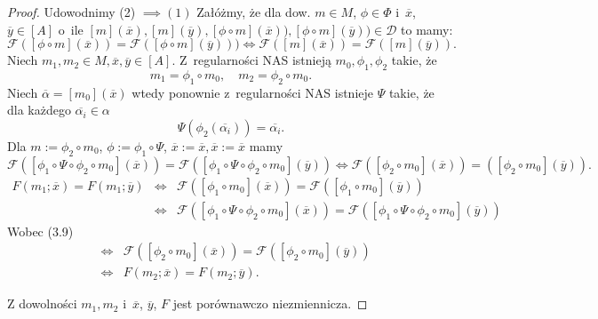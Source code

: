 \documentclass[12pt,a4paper]{report}
\newcommand{\domkniecie}[1]{\left[ {#1} \right] }
\begin{document}
\begin{proof}
Udowodnimy (2) $\implies (1)$
Załóżmy, że dla dow. $m \in M$, $\phi \in \Phi$ i~$\overline{x}$, $\overline{y} \in \domkniecie{A}$ o~ile $\domkniecie{m}(\overline{x}), \domkniecie{
m}(\overline{y}), \domkniecie{\phi\circ m}(\overline{x})), \domkniecie{\phi\circ m}(\overline{y})) \in \mathcal{D}$ to mamy:
\begin{equation}
\mathcal{F}(\domkniecie{\phi \circ m}(\overline{x}))=\mathcal{F}(\domkniecie{\phi \circ m}(\overline{y}))) \iff \mathcal{F}(\domkniecie{m}(\overline{x}))=\mathcal{F}(\domkniecie{m}(\overline{y})).
\end{equation}
Niech $m_1,m_2 \in M, \overline{x}, \overline{y} \in \domkniecie{A}$. Z~regularności NAS istnieją $m_0, \phi_1,\phi_2$ takie, że
$$ 
m_1=\phi_1\circ m_0, \quad m_2=\phi_2\circ m_0.
$$
Niech $\overline{\alpha}=\domkniecie{m_0}(\overline{x})$ wtedy ponownie z~regularności NAS istnieje $\Psi$ takie, że dla każdego $\overline{\alpha_i} \in \alpha$
$$
\Psi(\phi_2(\overline{\alpha_i}))=\overline{\alpha_i}.
$$
Dla $m:=\phi_2 \circ m_0$, $\phi:=\phi_1\circ \Psi$, $\overline{x}:=\overline{x}, \overline{x}:=\overline{x}$ mamy 
$$
\mathcal{F}(\domkniecie{\phi_1\circ \Psi \circ \phi_2\circ m_0}(\overline{x}))=\mathcal{F}(\domkniecie{\phi_1\circ \Psi \circ \phi_2\circ m_0}(\overline{y})) \iff \mathcal{F}(\domkniecie{\phi_2\circ m_0}(\overline{x}))=(\domkniecie{\phi_2\circ m_0}(\overline{y})).
$$
\begin{eqnarray*}
F(m_1;\overline{x})=F(m_1;\overline{y}) & \iff  & \mathcal{F}(\domkniecie{\phi_1\circ m_0}(\overline{x}))=\mathcal{F}(\domkniecie{\phi_1 \circ m_0}(\overline{y}))\\
&  \iff & \mathcal{F}(\domkniecie{\phi_1\circ\Psi\circ\phi_2\circ m_0}(\overline{x}))=\mathcal{F}(\domkniecie{\phi_1\circ\Psi\circ\phi_2\circ m_0}(\overline{y})) 
\end{eqnarray*}
Wobec (3.9)
\begin{eqnarray*}
& \iff & \mathcal{F}(\domkniecie{\phi_2\circ m_0}(\overline{x}))=\mathcal{F}(\domkniecie{\phi_2\circ m_0}(\overline{y}))\\
& \iff & F(m_2;\overline{x})=F(m_2;\overline{y}).
\end{eqnarray*}

Z dowolności $m_1, m_2$ i~$\overline{x}$, $\overline{y}$, $F$ jest porównawczo niezmiennicza.


\end{proof}
\end{document}
